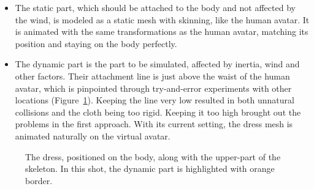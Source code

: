 \begin{itemize}
\item The static part, which should be attached to the body and not affected by the wind, is modeled as a static mesh with skinning, like the human avatar. It is animated with the same transformations as the human avatar, matching its position and staying on the body perfectly. 
\item The dynamic part is the part to be simulated, affected by inertia, wind and other factors. Their attachment line is just above the waist of the human avatar, which is pinpointed through try-and-error experiments with other locations (Figure~\ref{fig:dress_and_body}). Keeping the line very low resulted in both unnatural collisions and the cloth being too rigid. Keeping it too high brought out the problems in the first approach. With its current setting, the dress mesh is animated naturally on the virtual avatar.
\end{itemize}

\begin{figure}[h]
\centerline{}
\caption{The dress, positioned on the body, along with the upper-part of the skeleton. In this shot, the dynamic part is highlighted with orange border.}
\label{fig:dress_and_body}
\end{figure}


